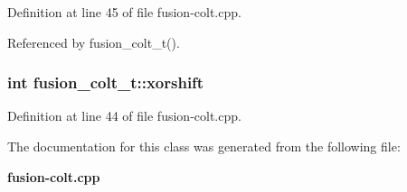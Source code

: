 Definition at line 45 of file fusion-colt.cpp.

Referenced by fusion\_\-colt\_\-t().
\subsubsection[{xorshift}]{\setlength{\rightskip}{0pt plus 5cm}int {\bf fusion\_\-colt\_\-t::xorshift}\hspace{0.3cm}{\tt  [protected]}}\label{classfusion__colt__t_3ff3b08667cae766bb2b30f4eadec129}




Definition at line 44 of file fusion-colt.cpp.

The documentation for this class was generated from the following file:\begin{CompactItemize}
\item 
{\bf fusion-colt.cpp}\end{CompactItemize}
